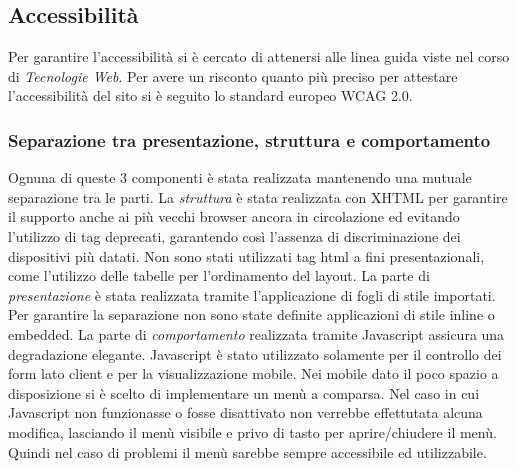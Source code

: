 \subsection{Accessibilità}
Per garantire l'accessibilità si è cercato di attenersi alle linea guida viste nel corso di \textit{Tecnologie Web}. Per avere un risconto quanto più preciso per attestare l'accessibilità del sito si è seguito lo standard europeo WCAG 2.0.
\subsubsection{Separazione tra presentazione, struttura e comportamento}
Ognuna di queste 3 componenti è stata realizzata mantenendo una mutuale separazione tra le parti. 
La \textit{struttura} è stata realizzata con XHTML per garantire il supporto anche ai più vecchi browser ancora in circolazione ed evitando l'utilizzo di tag deprecati, garantendo così l'assenza di discriminazione dei dispositivi più datati.
Non sono stati utilizzati tag html a fini presentazionali, come l'utilizzo delle tabelle per l'ordinamento del layout.
La parte di \textit{presentazione} è stata realizzata tramite l'applicazione di fogli di stile importati. Per garantire la separazione non sono state definite applicazioni di stile inline o embedded.
La parte di \textit{comportamento} realizzata tramite Javascript assicura una degradazione elegante. Javascript è stato utilizzato solamente per il controllo dei form lato client e per la visualizzazione mobile. Nei mobile dato il poco spazio a disposizione si è scelto di implementare un menù a comparsa. Nel caso in cui Javascript non funzionasse o fosse disattivato non verrebbe effettutata alcuna modifica, lasciando il menù visibile e privo di tasto per aprire/chiudere il menù. Quindi nel caso di problemi il menù sarebbe sempre accessibile ed utilizzabile.
\newpage
